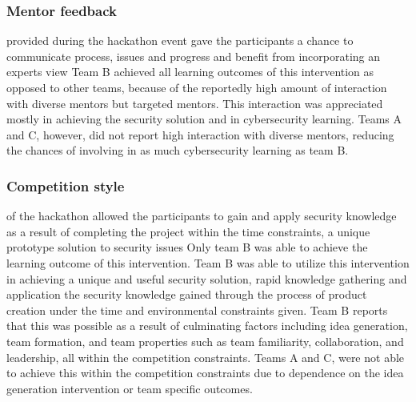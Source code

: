 \documentclass[runningheads]{llncs}
\begin{document}

\subsubsection{Mentor feedback} provided during the hackathon event gave the participants a chance to communicate process, issues and progress and benefit from incorporating an experts view %
Team B achieved all learning outcomes of this intervention as opposed to other teams, because of the reportedly high amount of interaction with diverse mentors but targeted mentors. This interaction was appreciated mostly in achieving the security solution and in cybersecurity learning.
Teams A and C, however, did not report high interaction with diverse mentors, reducing the chances of involving in as much cybersecurity learning as team B.

\subsubsection{Competition style} of the hackathon allowed the participants to gain and apply security knowledge as a result of completing the project within the time constraints, a unique prototype solution to security issues %
Only team B was able to achieve the learning outcome of this intervention. Team B was able to utilize this intervention in achieving a unique and useful security solution, rapid knowledge gathering and application the security knowledge gained through the process of product creation under the time and environmental constraints given. Team B reports that this was possible as a result of culminating factors including idea generation, team formation, and team properties such as team familiarity, collaboration, and leadership, all within the competition constraints. 
Teams A and C, were not able to achieve this within the competition constraints due to dependence on the idea generation intervention or team specific outcomes.
\end{document}
